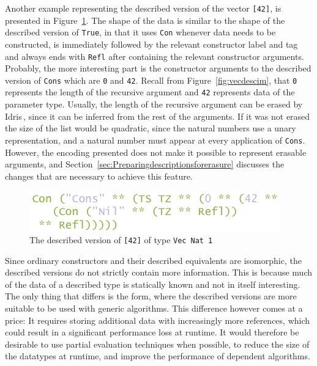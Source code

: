 \documentclass{ituthesis}
\newcommand{\ttconstructor}[1]{\textcolor{constructor-color}{\texttt{#1}}}
\newcommand{\tttype}[1]{\textcolor{type-color}{\texttt{#1}}}
\newcommand{\ttliteral}[1]{\textcolor{literal-color}{\texttt{#1}}}
\theoremstyle{break}
\begin{document}
Another example representing the described version of the vector \ttconstructor{[}\ttliteral{42}\ttconstructor{]}, is presented in Figure~\ref{fig:overheadlist}.
The shape of the data is similar to the shape of the described version of \ttconstructor{True}, in that it uses \ttconstructor{Con} whenever data needs to be constructed, is immediately followed by the relevant constructor label and tag and always ends with \ttconstructor{Refl}
after containing the relevant constructor arguments.
Probably, the more interesting part is the constructor arguments to the described version of \ttconstructor{Cons} which are \ttliteral{0} and \ttliteral{42}.
Recall from Figure~\ref{fig:vecdescim}, that \ttliteral{0} represents the length of the recursive argument and \ttliteral{42} represents data of the parameter type.
Usually, the length of the recursive argument can be erased by Idris\,\autocite{tejiscak2014erasure}, since it can be inferred from the rest of the arguments.
If it was not erased the size of the list would be quadratic, since the natural numbers use a unary representation, and a natural number must appear at every application of \ttconstructor{Cons}.
However, the encoding presented does not make it possible to represent erasable arguments, and Section~\ref{sec:Preparingdescriptionsforerasure} discusses the changes that are necessary to achieve this feature.

\begin{figure}[ht]
\begin{center}
    \includegraphics[scale=0.5]{Figures/GenericsOverheadList.png}
\end{center}
\caption{The described version of \ttconstructor{[}\ttliteral{42}\ttconstructor{]} of type \tttype{Vec}~\tttype{Nat}~\ttliteral{1}}
\label{fig:overheadlist}
\end{figure}

Since ordinary constructors and their described equivalents are isomorphic, the described versions do not strictly contain more information.
This is because much of the data of a described type is statically known and not in itself interesting.
The only thing that differs is the form, where the described versions are more suitable to be used with generic algorithms.
This difference however comes at a price: It requires storing additional data with increasingly more references, which could result in a significant performance loss at runtime.
It would therefore be desirable to use partial evaluation techniques when possible, to reduce the size of the datatypes at runtime, and improve the performance of dependent algorithms.
\end{document}
